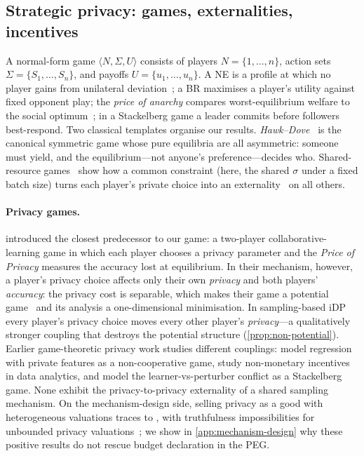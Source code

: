 \subsection{Strategic privacy: games, externalities, incentives}
\label{sec:related}

A normal-form game $\langle N, \Sigma, U\rangle$ consists of players
$N = \{1,\dots,n\}$, action sets $\Sigma = \{S_1, \dots, S_n\}$, and
payoffs $U = \{u_1,\dots,u_n\}$. A \ac{NE} is a
profile at which no player gains from unilateral
deviation~\cite{nash1950equilibrium}; a \ac{BR}
maximises a player's utility against fixed opponent play; the
\emph{price of anarchy} compares worst-equilibrium welfare to the
social optimum~\cite{koutsoupias1999worst}; in a Stackelberg game a
leader commits before followers best-respond. Two classical templates
organise our results. \emph{Hawk--Dove}~\cite{maynardsmith1973logic}
is the canonical symmetric game whose pure equilibria are all
asymmetric: someone must yield, and the equilibrium---not anyone's
preference---decides who. Shared-resource
games~\cite{hardin1968tragedy} show how a common constraint (here,
the shared $\sigma$ under a fixed batch size) turns each player's
private choice into an externality~\cite{buchanan1962externality} on
all others.

\paragraph{Privacy games.} \citet{pejo2019together} introduced the
closest predecessor to our game: a two-player collaborative-learning
game in which each player chooses a privacy parameter and the
\emph{Price of Privacy} measures the accuracy lost at equilibrium.
In their mechanism, however, a player's privacy choice affects only
their own \emph{privacy} and both players' \emph{accuracy}: the privacy
cost is separable, which makes their game a potential
game~\cite{monderer1996potential} and its analysis a one-dimensional
minimisation. In sampling-based \ac{iDP} every player's privacy choice
moves every other player's \emph{privacy}---a qualitatively stronger
coupling that destroys the potential structure
(\cref{prop:non-potential}). Earlier game-theoretic privacy work
studies different couplings: \citet{ioannidis2013linear} model
regression with private features as a non-cooperative game,
\citet{chessa2015game} study non-monetary incentives in data
analytics, and \citet{pawlick2016stackelberg} model the
learner-vs-perturber conflict as a Stackelberg game. None exhibit the
privacy-to-privacy externality of a shared sampling mechanism. On the
mechanism-design side, selling privacy as a good with heterogeneous
valuations traces to \citet{ghosh2011selling}, with truthfulness
impossibilities for unbounded privacy
valuations~\cite{nissim2014redrawing, chen2013truthful}; we show in
\cref{app:mechanism-design} why these positive results do not rescue
budget declaration in the \ac{PEG}.

